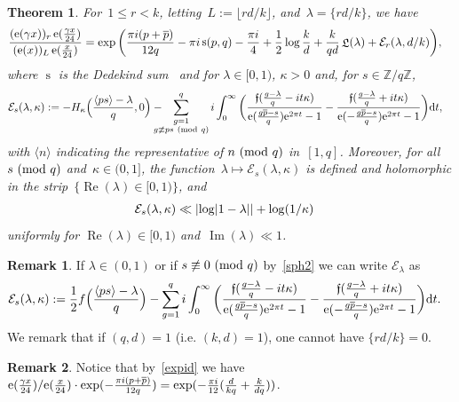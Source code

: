 \documentclass[11pt]{amsart}
\newcommand{\Z}{\mathbb{Z}}
\newcommand{\ang}[1]{\langle#1\rangle}
\newcommand{\lf}{{\mathfrak f}}
\renewcommand{\mod}[1]{~\pr{\textnormal{mod}~#1}}
\newcommand{\Er}{{\mathcal E}}
\newtheorem{theorem}[theo]{Theorem}
\theoremstyle{definition}
\newtheorem{remark}{Remark}
\newcommand{\ssum}[1]{\sum_{\substack{#1}}}
\newcommand{\pr}[1]{\mathchoice{\left( #1\right)}{(#1)}{(#1)}{(#1)}}
\newcommand{\e}[1][]{\ifthenelse{\equal{#1}{}}{{\rm e}}{\operatorname{e}\pr{ #1}}}
\newcommand{\df}{\mathrm{d}}
\DeclareMathOperator{\Lie}{{\mathfrak L}}
\DeclareMathOperator{\deks}{s}
\renewcommand\Re{\operatorname{Re}}
\renewcommand\Im{\operatorname{Im}}
\newcommand{\1}{{\mathbf 1}}
\newcommand{\abs}[1]{\left|#1\right|}
\renewcommand{\bar}[1]{\overline{#1}}
\let\originalleft\left
\let\originalright\right
\renewcommand{\left}{\mathopen{}\mathclose\bgroup\originalleft}
\renewcommand{\right}{\aftergroup\egroup\originalright}
\numberwithin{equation}{section}
\begin{document}
\begin{theorem}\label{th:Ir}
  For~$1\leq r < k$, letting~$L := \lfloor rd/k\rfloor$, and~$\lambda = \{rd/k\}$, we have
  \begin{align*} 
    \frac{(\e[\gamma x])_r\e[\frac{\gamma x}{24}]}{(\e[x])_L\e[\frac{x}{24} ]} =\exp\bigg(&
    \frac{\pi i(p+\overline p)}{12q}-\pi i \deks(p,q)-\frac{\pi i }4+\frac12 \log\frac kd+
    \frac{k}{qd} \Lie(\lambda)+\Er_r(\lambda,d/k)\bigg), 
  \end{align*}
  where $\deks$ is the Dedekind sum~\cite[p.45]{Iwaniec1997} and for $\lambda\in[0,1)$, $\kappa>0$ and, for $s\in\Z/q\Z$,
  \begin{align} 
    \Er_s(\lambda,\kappa)&:=- H_{\kappa}\Big(\frac{\ang{ps} -\lambda}{q},0\Big)-\hspace{-1em} \ssum{g=1\\ g\not\equiv ps\mod q}^q i\int_{0}^\infty   \bigg( \frac{\lf(\frac{g-\lambda}q - it\kappa)}{\e[ \frac{g\bar{p}-s}q]\e^{2\pi t}-1}-   \frac{\lf(\frac{g-\lambda}q + it\kappa)}{\e[- \frac{g\bar{p}-s}q]\e^{2\pi t}-1}\bigg)\df{t}, 
    \label{defg}
  \end{align}
  with $\ang{n}$ indicating the representative of $n\mod q$ in~$[1,q]$. Moreover, for all~$s\mod{q}$ and~$\kappa\in(0, 1]$, the function~$\lambda\mapsto \Er_s(\lambda,\kappa)$ is defined and holomorphic in the strip~$\{\Re(\lambda)\in[0, 1)\}$, and
  \begin{align} 
    \Er_s(\lambda,\kappa)&\ll \abs{\log\abs{1-\lambda}} + \log(1/\kappa)
    \label{bdfg}
  \end{align}
  uniformly for $\Re(\lambda)\in[0,1)$ and~$\Im(\lambda)\ll 1$.
\end{theorem}
\begin{remark}
  If $\lambda\in(0,1)$ or if $s\not\equiv 0\mod q$ by~\eqref{sph2} we can write $\Er_\lambda$ as 
  \begin{align} 
    \Er_s(\lambda,\kappa)&:= \frac12 f\Big(\frac{\ang{ps}-\lambda}q\Big)- \sum_{g=1}^q i\int_{0}^\infty   \bigg( \frac{\lf(\frac{g-\lambda}q - it\kappa)}{\e[ \frac{g\bar{p}-s}q]\e^{2\pi t}-1}-   \frac{\lf(\frac{g-\lambda}q + it\kappa)}{\e[- \frac{g\bar{p}-s}q]\e^{2\pi t}-1}\bigg)\df{t}.
    \label{defg2}
  \end{align}
  We remark that if $(q,d)=1$ (i.e. $(k,d)=1$), one cannot have $\{rd/k\}=0$. \end{remark}
\begin{remark}\label{remplr}
  Notice that by~\eqref{expid} we have ${\e[\frac{\gamma x}{24}]}/{\e[\frac{x}{24} ]}\cdot \exp( - \frac{\pi i(p+\overline p)}{12q} )=\exp(-\frac{\pi i}{12} (\frac{d}{ kq}+\frac{k}{dq}))$.
\end{remark}
\end{document}
